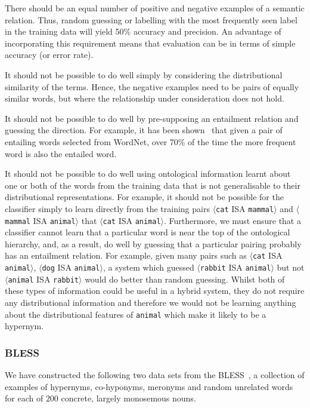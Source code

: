\documentclass[11pt]{article}
\newcommand\pair[2]{$\langle$\texttt{#1} ISA \texttt{#2}$\rangle$}
\begin{document}
There should be an equal number of positive and negative examples of a semantic relation.  Thus, random guessing or labelling with the most frequently seen label in the training data will yield 50\% accuracy and precision.  An advantage of incorporating this requirement means that evaluation can be in terms of simple accuracy (or error rate).

It should not be possible to do well simply by considering the distributional similarity of the terms.  Hence, the negative examples need to be pairs of equally similar words, but where the relationship under consideration does not hold.

It should not be possible to do well by pre-supposing an entailment relation and guessing the direction.  For example, it has been shown~\cite{Weeds2004} that given a pair of entailing words selected from WordNet, over 70\% of the time the more frequent word is also the entailed word.

It should not be possible to do well using ontological information learnt about one or both of the words from the training data that is not generalisable to their distributional representations.  For example, it should not be possible for the classifier simply to learn directly from the training pairs \pair{cat}{mammal} and \pair{mammal}{animal}  that \pair{cat}{animal}.  Furthermore, we must ensure that a classifier cannot learn that a particular word is near the top of the ontological hierarchy, and, as a result, do well by guessing that a particular pairing probably has an entailment relation.  For example, given many pairs such as \pair{cat}{animal}, \pair{dog}{animal}, a system which guessed \pair{rabbit}{animal} but not \pair{animal}{rabbit} would do better than random guessing.  Whilst both of these types of information could be useful in a hybrid system, they do not require any distributional information and therefore we would not be learning anything about the distributional features of \texttt{animal} which make it likely to be a hypernym.

\subsubsection{BLESS}

We have constructed the following two  data sets from the BLESS~\cite{Baroni2011}, a collection of examples of hypernyms, co-hyponyms, meronyms and random unrelated words for each of $200$ concrete, largely monosemous nouns.

\smallskip
\end{document}
